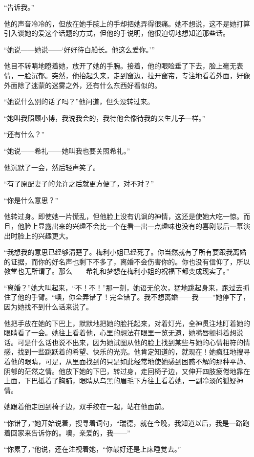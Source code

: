 \par “告诉我。”
\par 他的声音冷冷的，但放在她手腕上的手却把她弄得很痛。她不想说，这不是她打算引入谈她的爱这个话题的方式，但他的手说明，他很迫切地想知道那些话。
\par “她说——她说——‘好好待白船长。他这么爱你。'”
\par 他目不转睛地瞪着她，放开了她的手腕。接着，他的眼睑垂了下去，脸上毫无表情，一脸沉郁。突然，他抬起头来，走到窗边，拉开窗帘，专注地看着外面，好像外面除了迷蒙的迷雾之外，还有什么东西好看似的。
\par “她说什么别的话了吗？”他问道，但头没转过来。
\par “她叫我照顾小博，我说我会的，我待他会像待我的亲生儿子一样。”
\par “还有什么？”
\par “她说——希礼——她叫我也要关照希礼。”
\par 他沉默了一会，然后轻声笑了。
\par “有了原配妻子的允许之后就更方便了，对不对？”
\par “你是什么意思？”
\par 他转过身。即使她一片慌乱，但他脸上没有讥讽的神情，这还是使她大吃一惊。而且，他脸上显露出来的兴趣不会比一个在看一出一点趣味也没有的喜剧最后一幕演出时脸上的兴趣更大。
\par “我想我的意思已经够清楚了。梅利小姐已经死了。你当然就有了所有要跟我离婚的证据，而你的好名声也剩下不多了，离婚不会伤害你的。你也没有信仰了，所以教堂也无所谓了。那么——希礼和梦想在梅利小姐的祝福下都变成现实了。”
\par “离婚？”她大叫起来，“不！不！”那一刻，她语无伦次，猛地跳起身来，跑过去抓住了他的手臂。“噢，你全弄错了！完全错了。我不想离婚——我——”她停下了，因为她找不到什么话来说了。
\par 他把手放在她的下巴上，默默地把她的脸托起来，对着灯光，全神贯注地盯着她的眼睛看了一会。她往上看着他，心里的想法在眼里一览无遗，她嘴唇颤抖着想说话。可是什么话也说不出来，因为她试图从他的脸上找到某些与她的心情相符的情感，找到一些跳跃着的希望、快乐的光亮。他肯定知道的，就现在！她疯狂地搜寻着他的眼睛，可是，从里面找到的只是如此经常地使她感到困惑不解的那种平静、阴郁的茫然之情。他放下她的下巴，转过身，走回椅子边，又伸开四肢疲倦地靠在上面，下巴抵着了胸脯，眼睛从乌黑的眉毛下方往上看着她，一副冷淡的狐疑神情。
\par 她跟着他走回到椅子边，双手绞在一起，站在他面前。
\par “你错了，”她开始说着，搜寻着词句，“瑞德，就在今晚，我知道以后，我是一路跑着回家来告诉你的。噢，亲爱的，我——”
\par “你累了，”他说，还在注视着她，“你最好还是上床睡觉去。”
